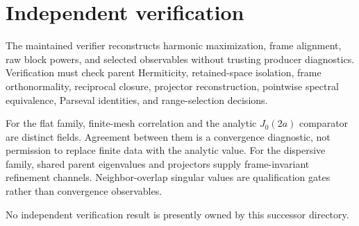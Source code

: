 \section{Independent verification}

The maintained verifier reconstructs harmonic maximization, frame alignment, raw block
powers, and selected observables without trusting producer diagnostics.  Verification
must check parent Hermiticity, retained-space isolation, frame orthonormality, reciprocal
closure, projector reconstruction, pointwise spectral equivalence, Parseval identities,
and range-selection decisions.

For the flat family, finite-mesh correlation and the analytic $J_0(2a)$ comparator are
distinct fields.  Agreement between them is a convergence diagnostic, not permission to
replace finite data with the analytic value.  For the dispersive family, shared parent
eigenvalues and projectors supply frame-invariant refinement channels.  Neighbor-overlap
singular values are qualification gates rather than convergence observables.

No independent verification result is presently owned by this successor directory.
